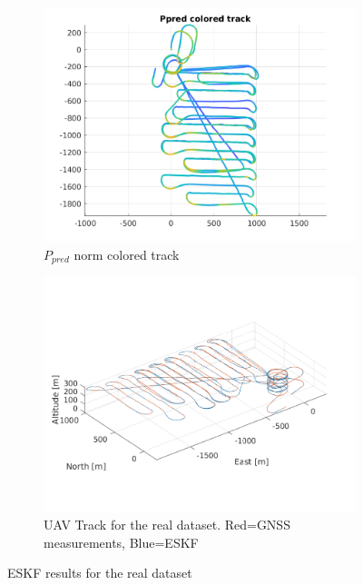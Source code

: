 \begin{figure}
        \begin{subfigure}[b]{0.49\textwidth}
                \includegraphics[width=\textwidth]{plots/a2-real-ppred-colored-track}
                \caption{$P_{pred}$ norm colored track}
                \label{fig:eskf-real-ppred-coloredtrack}
        \end{subfigure}
        \hfill
        \begin{subfigure}[b]{0.49\textwidth}
                \includegraphics[width=\textwidth]{plots/a2-real-track}
                \caption{UAV Track for the real dataset. Red=GNSS measurements, Blue=ESKF}
                \label{fig:eskf-real-track}
        \end{subfigure}
        \caption{ESKF results for the real dataset}
\end{figure}

